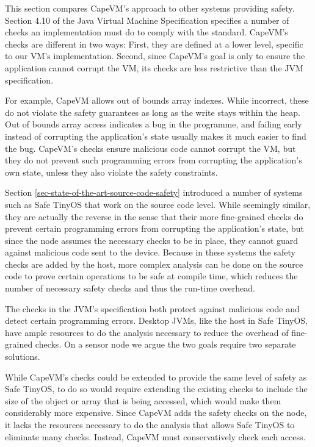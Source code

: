 This section compares CapeVM's approach to other systems providing safety. Section 4.10 of the Java Virtual Machine Specification \cite{Lindholm:2017vu} specifies a number of checks an implementation must do to comply with the standard. CapeVM's checks are different in two ways: First, they are defined at a lower level, specific to our VM's implementation. Second, since CapeVM's goal is only to ensure the application cannot corrupt the VM, its checks are less restrictive than the JVM specification.

For example, CapeVM allows out of bounds array indexes. While incorrect, these do not violate the safety guarantees as long as the write stays within the heap. Out of bounds array access indicates a bug in the programme, and failing early instead of corrupting the application's state usually makes it much easier to find the bug. CapeVM's checks ensure malicious code cannot corrupt the VM, but they do not prevent such programming errors from corrupting the application's own state, unless they also violate the safety constraints.

Section \ref{sec-state-of-the-art-source-code-safety} introduced a number of systems such as Safe TinyOS \cite{Cooprider:2007ub} that work on the source code level. While seemingly similar, they are actually the reverse in the sense that their more fine-grained checks do prevent certain programming errors from corrupting the application's state, but since the node assumes the necessary checks to be in place, they cannot guard against malicious code sent to the device. Because in these systems the safety checks are added by the host, more complex analysis can be done on the source code to prove certain operations to be safe at compile time, which reduces the number of necessary safety checks and thus the run-time overhead.

The checks in the JVM's specification both protect against malicious code and detect certain programming errors. Desktop JVMs, like the host in Safe TinyOS, have ample resources to do the analysis necessary to reduce the overhead of fine-grained checks. On a sensor node we argue the two goals require two separate solutions.

While CapeVM's checks could be extended to provide the same level of safety as Safe TinyOS, to do so would require extending the existing checks to include the size of the object or array that is being accessed, which would make them considerably more expensive. Since CapeVM adds the safety checks on the node, it lacks the resources necessary to do the analysis that allows Safe TinyOS to eliminate many checks. Instead, CapeVM must conservatively check each access.

